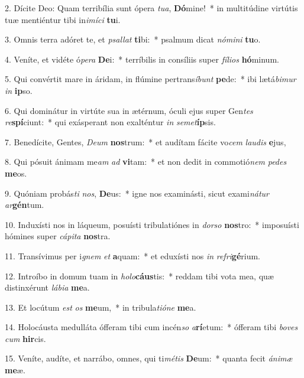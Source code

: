 2. Dícite Deo: Quam terribília sunt ópera \textit{tu}\textit{a}, \textbf{Dó}mine!~*  in multitúdine virtútis tuæ mentiéntur tibi in\textit{i}\textit{mí}\textit{ci} \textbf{tu}i.\

3. Omnis terra adóret te, et \textit{psal}\textit{lat} \textbf{ti}bi:~*  psalmum dicat \textit{nó}\textit{mi}\textit{ni} \textbf{tu}o.\

4. Veníte, et vidéte ó\textit{pe}\textit{ra} \textbf{De}i:~*  terríbilis in consíliis super \textit{fí}\textit{li}\textit{os} \textbf{hó}minum.\

5. Qui convértit mare in áridam, in flúmine pertrans\textit{í}\textit{bunt} \textbf{pe}de:~*  ibi lætá\textit{bi}\textit{mur} \textit{in} \textbf{ip}so.\

6. Qui dominátur in virtúte sua in ætérnum, óculi ejus super Gen\textit{tes} \textit{re}\textbf{spí}ciunt:~*  qui exásperant non exalténtur \textit{in} \textit{se}\textit{met}\textbf{íp}sis.\

7. Benedícite, Gentes, \textit{De}\textit{um} \textbf{nos}trum:~*  et audítam fácite vo\textit{cem} \textit{lau}\textit{dis} \textbf{e}jus,\

8. Qui pósuit ánimam me\textit{am} \textit{ad} \textbf{vi}tam:~*  et non dedit in commotió\textit{nem} \textit{pe}\textit{des} \textbf{me}os.\

9. Quóniam probás\textit{ti} \textit{nos}, \textbf{De}us:~*  igne nos examinásti, sicut exami\textit{ná}\textit{tur} \textit{ar}\textbf{gén}tum.\

10. Induxísti nos in láqueum, posuísti tribulatiónes in \textit{dor}\textit{so} \textbf{nos}tro:~*  imposuísti hómines super \textit{cá}\textit{pi}\textit{ta} \textbf{nos}tra.\

11. Transívimus per i\textit{gnem} \textit{et} \textbf{a}quam:~*  et eduxísti nos \textit{in} \textit{re}\textit{fri}\textbf{gé}rium.\

12. Introíbo in domum tuam in \textit{ho}\textit{lo}\textbf{cáus}tis:~*  reddam tibi vota mea, quæ distinxérunt \textit{lá}\textit{bi}\textit{a} \textbf{me}a.\

13. Et locútum \textit{est} \textit{os} \textbf{me}um,~*  in tribula\textit{ti}\textit{ó}\textit{ne} \textbf{me}a.\

14. Holocáusta medulláta ófferam tibi cum incén\textit{so} \textit{a}\textbf{rí}etum:~*  ófferam tibi \textit{bo}\textit{ves} \textit{cum} \textbf{hir}cis.\

15. Veníte, audíte, et narrábo, omnes, qui ti\textit{mé}\textit{tis} \textbf{De}um:~*  quanta fecit \textit{á}\textit{ni}\textit{mæ} \textbf{me}æ.\


